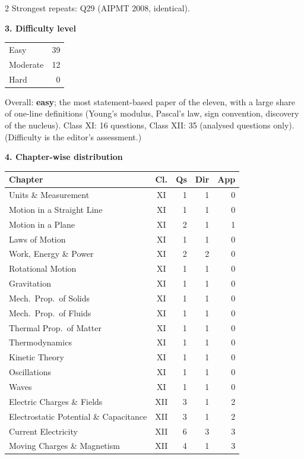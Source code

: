 \begin{multicols}{2}
{\footnotesize Strongest repeats: Q29 (AIPMT 2008, identical).}\par\medskip
\textbf{\color{crimson}3. Difficulty level}\par\smallskip
\begin{tabular}{@{}lr@{}}\toprule
Easy & 39\\ Moderate & 12\\ Hard & 0\\\bottomrule\end{tabular}\par\smallskip
{\footnotesize Overall: \textbf{easy}; the most statement-based paper of the eleven, with a large share of one-line definitions (Young's modulus, Pascal's law, sign convention, discovery of the nucleus). Class XI: 16 questions, Class XII: 35 (analysed questions only). (Difficulty is the editor's assessment.)}\par\medskip
\columnbreak
\textbf{\color{crimson}4. Chapter-wise distribution}\par\smallskip
{\footnotesize\begin{tabular}{@{}p{4.7cm}c@{\,}r@{\,}r@{\,}r@{}}\toprule
Chapter & Cl. & Qs & Dir & App\\\midrule
Units \& Measurement & XI & 1 & 1 & 0\\
Motion in a Straight Line & XI & 1 & 1 & 0\\
Motion in a Plane & XI & 2 & 1 & 1\\
Laws of Motion & XI & 1 & 1 & 0\\
Work, Energy \& Power & XI & 2 & 2 & 0\\
Rotational Motion & XI & 1 & 1 & 0\\
Gravitation & XI & 1 & 1 & 0\\
Mech.\ Prop.\ of Solids & XI & 1 & 1 & 0\\
Mech.\ Prop.\ of Fluids & XI & 1 & 1 & 0\\
Thermal Prop.\ of Matter & XI & 1 & 1 & 0\\
Thermodynamics & XI & 1 & 1 & 0\\
Kinetic Theory & XI & 1 & 1 & 0\\
Oscillations & XI & 1 & 1 & 0\\
Waves & XI & 1 & 1 & 0\\
Electric Charges \& Fields & XII & 3 & 1 & 2\\
Electrostatic Potential \& Capacitance & XII & 3 & 1 & 2\\
Current Electricity & XII & 6 & 3 & 3\\
Moving Charges \& Magnetism & XII & 4 & 1 & 3\\

\end{tabular}}
\end{multicols}
